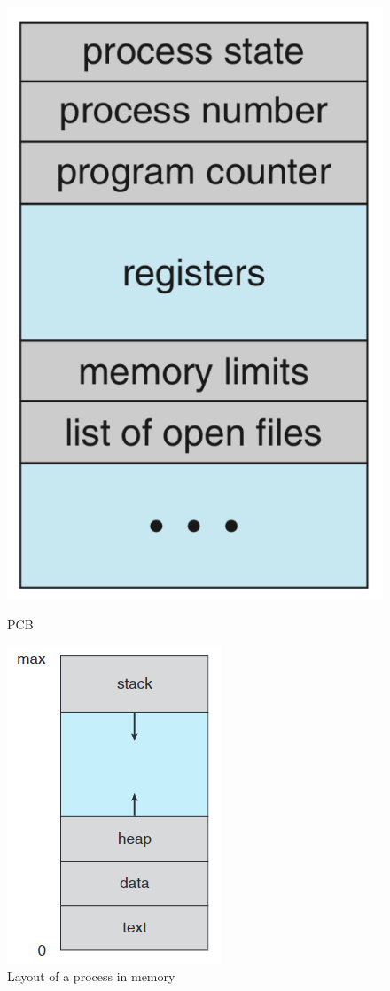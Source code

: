 \begin{figure}[H]
    \centering
    \begin{minipage}{0.48\linewidth}
        \centering
        \includegraphics[height=\linewidth]{pic/OS3/PCB.png}
        \caption{PCB}
    \end{minipage}
    \begin{minipage}{0.48\linewidth}
        \centering
        \includegraphics[height=\linewidth]{pic/OS3/Layout of a process in memory.png}
        \caption{Layout of a process in memory}
    \end{minipage}
\end{figure}

